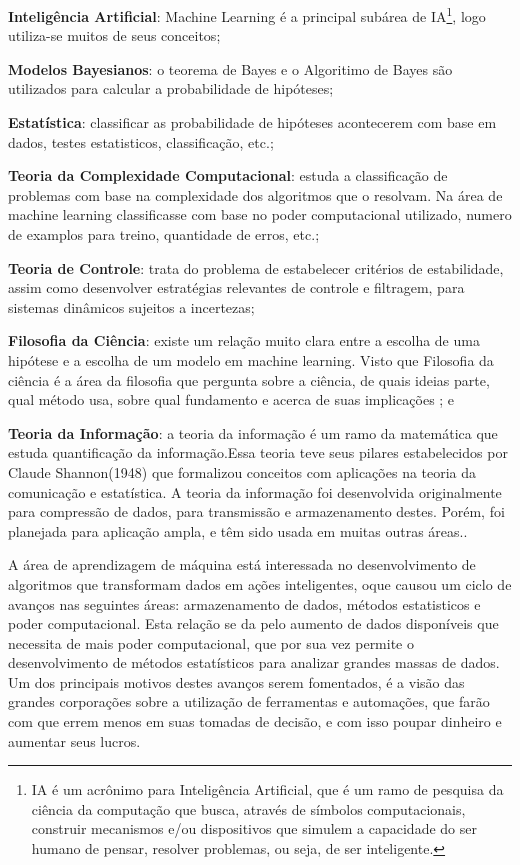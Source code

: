  \begin{alineascomponto}
	\item \textbf{Inteligência Artificial}: Machine Learning é a principal subárea de IA\footnote{IA é um acrônimo para Inteligência Artificial,
	 que é um ramo de pesquisa da ciência da computação que busca, através de símbolos computacionais, construir mecanismos 
	 e/ou dispositivos que simulem a capacidade do ser humano de pensar, resolver problemas, ou seja, de ser inteligente.\cite{IA_Web}},
	 logo utiliza-se muitos de seus conceitos;  
	\item \textbf{Modelos Bayesianos}: o teorema de Bayes e o Algoritimo de Bayes são utilizados para calcular a probabilidade de hipóteses;
	\item \textbf{Estatística}: classificar as probabilidade de hipóteses acontecerem com base em dados, testes estatisticos, classificação, etc.;
	\item \textbf{Teoria da Complexidade Computacional}: estuda a classificação de problemas com base na complexidade dos algoritmos que
	o resolvam. Na área de machine learning classificasse com base no poder computacional utilizado, numero de examplos para treino, quantidade de erros, etc.;   
	\item \textbf{Teoria de Controle}: trata do problema de estabelecer critérios de estabilidade, assim como desenvolver estratégias 
	relevantes de controle e filtragem, para sistemas dinâmicos sujeitos a incertezas;
	\item \textbf{Filosofia da Ciência}: existe um relação muito clara entre a escolha de uma hipótese e a escolha de um modelo em machine learning. Visto que Filosofia da ciência é a área da filosofia que pergunta sobre a ciência, de quais ideias parte, qual método usa, sobre qual fundamento e acerca de suas implicações \cite{FilosofiaCiencia}; e
	\item \textbf{Teoria da Informação}: a teoria da informação é um ramo da matemática que estuda quantificação da informação.Essa teoria teve seus 
	pilares estabelecidos por Claude Shannon(1948) que formalizou conceitos com aplicações na teoria da comunicação e estatística. 
	A teoria da informação foi desenvolvida originalmente para compressão de dados, para transmissão e armazenamento destes. 
	Porém, foi planejada para aplicação ampla, e têm sido usada em muitas outras áreas.\cite{TeoriaInformacao}.	
\end{alineascomponto}

A área de aprendizagem de máquina está interessada no desenvolvimento de algoritmos que transformam dados em ações inteligentes, oque causou
um ciclo de avanços nas seguintes áreas: armazenamento de dados, métodos estatisticos e poder computacional. Esta relação se da pelo aumento de dados disponíveis que necessita de 
mais poder computacional, que por sua vez permite o desenvolvimento de métodos estatísticos para analizar grandes massas de dados. Um dos principais motivos destes avanços serem fomentados, 
é a visão das grandes corporações sobre a utilização de ferramentas e automações, que farão com que errem menos em suas tomadas de decisão, e com isso poupar dinheiro e aumentar seus lucros.

